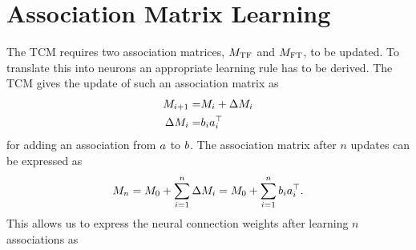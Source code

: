 \chapter{Association Matrix Learning}

The TCM requires two association matrices, $M_{\mathrm{TF}}$ and $M_{\mathrm{FT}}$, to be updated.
To translate this into neurons an appropriate learning rule has to be derived.
The TCM gives the update of such an association matrix as
\begin{eqnarray}
    M_{i+1} =& M_i + \Delta M_i \\
    \Delta M_i =& b_i a_i^{\top}
\end{eqnarray}
for adding an association from $a$ to $b$.
The association matrix after $n$ updates can be expressed as
\begin{equation}
    M_n = M_0 + \sum_{i=1}^{n} \Delta M_i = M_0 + \sum_{i=1}^n b_i a_i^{\top} \text{.}
\end{equation}
This allows us to express the neural connection weights after learning $n$ associations as
\begin{equation}

\end{equation}
